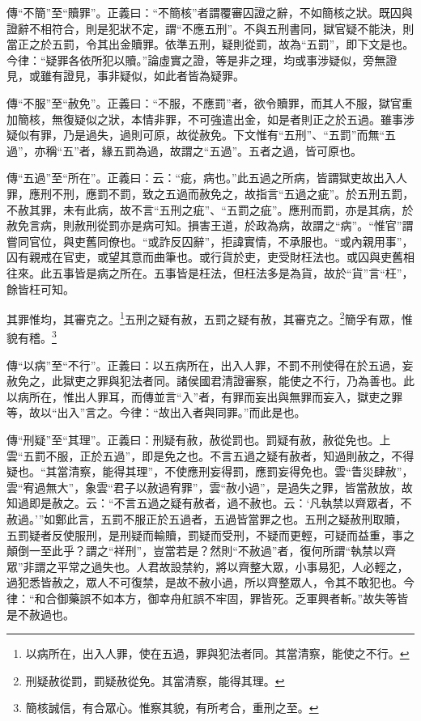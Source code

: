 {\noindent\zhuan{}\fzbyks 傳“不簡”至“贖罪”。正義曰：“不簡核”者謂覆審囚證之辭，不如簡核之狀。既囚與證辭不相符合，則是犯狀不定，謂“不應五刑”。不與五刑書同，獄官疑不能決，則當正之於五罰，令其出金贖罪。依準五刑，疑則從罰，故為“五罰”，即下文是也。今律：“疑罪各依所犯以贖。”論虛實之證，等是非之理，均或事涉疑似，旁無證見，或雖有證見，事非疑似，如此者皆為疑罪。 \par}

{\noindent\zhuan{}\fzbyks 傳“不服”至“赦免”。正義曰：“不服，不應罰”者，欲令贖罪，而其人不服，獄官重加簡核，無復疑似之狀，本情非罪，不可強遣出金，如是者則正之於五過。雖事涉疑似有罪，乃是過失，過則可原，故從赦免。下文惟有“五刑”、“五罰”而無“五過”，亦稱“五”者，緣五罰為過，故謂之“五過”。五者之過，皆可原也。 \par}

{\noindent\zhuan{}\fzbyks 傳“五過”至“所在”。正義曰：云：“疵，病也。”此五過之所病，皆謂獄吏故出入人罪，應刑不刑，應罰不罰，致之五過而赦免之，故指言“五過之疵”。於五刑五罰，不赦其罪，未有此病，故不言“五刑之疵”、“五罰之疵”。應刑而罰，亦是其病，於赦免言病，則赦刑從罰亦是病可知。損害王道，於政為病，故謂之“病”。“惟官”謂嘗同官位，與吏舊同僚也。“或詐反囚辭”，拒諱實情，不承服也。“或內親用事”，囚有親戒在官吏，或望其意而曲筆也。或行貨於吏，吏受財枉法也。或囚與吏舊相往來。此五事皆是病之所在。五事皆是枉法，但枉法多是為貨，故於“貨”言“枉”，餘皆枉可知。 \par}

其罪惟均，其審克之。\footnote{以病所在，出入人罪，使在五過，罪與犯法者同。其當清察，能使之不行。}五刑之疑有赦，五罰之疑有赦，其審克之。\footnote{刑疑赦從罰，罰疑赦從免。其當清察，能得其理。}簡孚有眾，惟貌有稽。\footnote{簡核誠信，有合眾心。惟察其貌，有所考合，重刑之至。}


{\noindent\zhuan{}\fzbyks 傳“以病”至“不行”。正義曰：以五病所在，出入人罪，不罰不刑使得在於五過，妄赦免之，此獄吏之罪與犯法者同。諸侯國君清證審察，能使之不行，乃為善也。此以病所在，惟出人罪耳，而傳並言“入”者，有罪而妄出與無罪而妄入，獄吏之罪等，故以“出入”言之。今律：“故出入者與同罪。”而此是也。 \par}

{\noindent\zhuan{}\fzbyks 傳“刑疑”至“其理”。正義曰：刑疑有赦，赦從罰也。罰疑有赦，赦從免也。上雲“五罰不服，正於五過”，即是免之也。不言五過之疑有赦者，知過則赦之，不得疑也。“其當清察，能得其理”，不使應刑妄得罰，應罰妄得免也。雲“眚災肆赦”，雲“宥過無大”，象雲“君子以赦過宥罪”，雲“赦小過”，是過失之罪，皆當赦放，故知過即是赦之。云：“不言五過之疑有赦者，過不赦也。云：‘凡執禁以齊眾者，不赦過。’”如鄭此言，五罰不服正於五過者，五過皆當罪之也。五刑之疑赦刑取贖，五罰疑者反使服刑，是刑疑而輸贖，罰疑而受刑，不疑而更輕，可疑而益重，事之顛倒一至此乎？謂之“祥刑”，豈當若是？然則“不赦過”者，復何所謂“執禁以齊眾”非謂之平常之過失也。人君故設禁約，將以齊整大眾，小事易犯，人必輕之，過犯悉皆赦之，眾人不可復禁，是故不赦小過，所以齊整眾人，令其不敢犯也。今律：“和合御藥誤不如本方，御幸舟舡誤不牢固，罪皆死。乏軍興者斬。”故失等皆是不赦過也。 \par}

